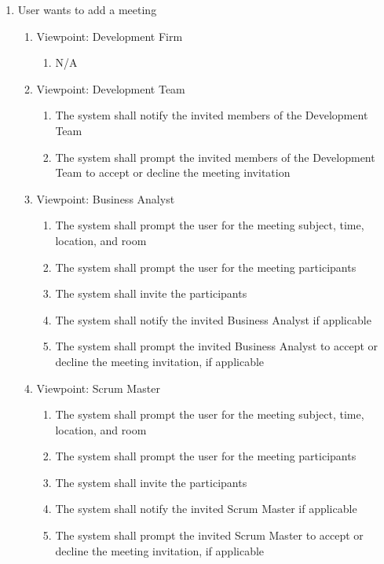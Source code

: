 \documentclass[12pt, titlepage]{article}
\begin{document}
\begin{enumerate}[{BE}1.]
	\item User wants to add a meeting %
	\begin{enumerate}[{VP}1.] 
	    \item Viewpoint: Development Firm
	        \begin{enumerate}
	            \item[] N/A
	        \end{enumerate}
	    \item Viewpoint: Development Team
	        \begin{enumerate}
	            \item The system shall notify the invited members of the Development Team
	            \item The system shall prompt the invited members of the Development Team to accept or decline the meeting invitation
	        \end{enumerate}
		\item Viewpoint: Business Analyst
			\begin{enumerate}
	            \item The system shall prompt the user for the meeting subject, time, location, and room
	            \item The system shall prompt the user for the meeting participants
	            \item The system shall invite the participants
	            \item The system shall notify the invited Business Analyst if applicable
	            \item The system shall prompt the invited Business Analyst to accept or decline the meeting invitation, if applicable
			\end{enumerate}
		\item Viewpoint: Scrum Master
			\begin{enumerate}
	            \item The system shall prompt the user for the meeting subject, time, location, and room
	            \item The system shall prompt the user for the meeting participants
	            \item The system shall invite the participants
	            \item The system shall notify the invited Scrum Master if applicable
	            \item The system shall prompt the invited Scrum Master to accept or decline the meeting invitation, if applicable
			\end{enumerate}
	\end{enumerate}
	

\end{enumerate}
\end{document}
